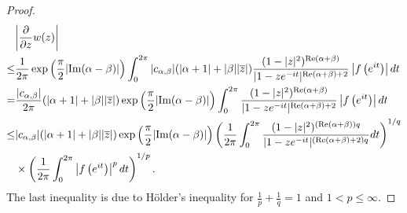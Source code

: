 \documentclass[11pt, reqno]{amsart}
\theoremstyle{definition}
\numberwithin{equation}{section}
\newcommand{\abs}[1]{\left\vert#1\right\vert}
\theoremstyle{remark}
\numberwithin{equation}{section}
\begin{document}
\begin{proof}
\begin{align*}
\begin{split}
		&\bigg|\frac{\partial}{\partial z}w(z)\bigg|\\\leq& \frac{1}{2\pi}\exp\left(\frac{\pi}{2}|\text{\rm Im}(\alpha-\beta)|\right) \int_0^{2\pi}|c_{\alpha,\beta}|(|\alpha +1 |+|\beta| |\overline{z}|)\frac{(1-|z|^2)^{\text{Re}(\alpha+\beta)}}{|1-ze^{-it}|^{\text{Re}(\alpha+\beta)+2}}\abs{f\left(e^{it}\right)}dt\\=& \frac{|c_{\alpha,\beta}|}{2\pi}(|\alpha +1 |+|\beta| |\overline{z}|)\exp\left(\frac{\pi}{2}|\text{\rm Im}(\alpha-\beta)|\right) \int_0^{2\pi}\frac{(1-|z|^2)^{\text{Re}(\alpha+\beta)}}{|1-ze^{-it}|^{\text{Re}(\alpha+\beta)+2}}\abs{f\left(e^{it}\right)} dt\\\leq& |c_{\alpha,\beta}|(|\alpha +1 |+|\beta| |\overline{z}|)\exp\left(\frac{\pi}{2}|\text{\rm Im}(\alpha-\beta)|\right)\left(\frac{1}{2\pi}\int_0^{2\pi}\frac{(1-|z|^2)^{(\text{Re}(\alpha+\beta))q}}{|1-ze^{-it}|^{(\text{Re}(\alpha+\beta)+2)q}}dt\right)^{1/q}\\&\times\left(\frac{1}{2\pi}\int_0^{2\pi}\abs{f\left(e^{it}\right)}^pdt\right)^{1/p}.
        \end{split}
	\end{align*}
	The last inequality is due to H\"older's inequality for $\frac{1}{p}+\frac{1}{q}=1$	and $1<p\leq \infty$.
    

\end{proof}
\end{document}
